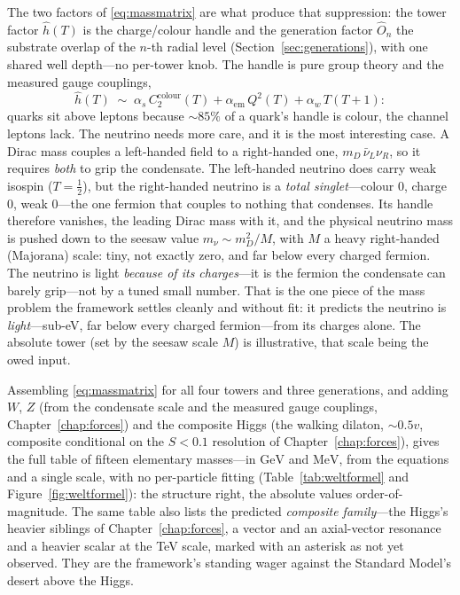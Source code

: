 The two factors of \eqref{eq:massmatrix} are what produce that suppression: the tower factor
$\hat h(T)$ is the charge/colour handle and the generation factor $\hat O_n$ the substrate overlap
of the $n$-th radial level (Section~\ref{sec:generations}), with one shared well depth---no
per-tower knob. The handle is pure group theory and the measured gauge couplings,
\begin{equation}
  \hat h(T) \;\sim\; \alpha_s\,C_2^{\mathrm{colour}}(T) + \alpha_{\mathrm{em}}\,Q^2(T)
                     + \alpha_w\,T(T{+}1):
\end{equation}
quarks sit above leptons because $\sim\!85\%$ of a quark's handle is colour, the channel leptons
lack. The neutrino needs more care, and it is the most interesting case. A Dirac mass couples a
left-handed field to a right-handed one, $m_D\,\bar\nu_L\nu_R$, so it requires \emph{both} to grip
the condensate. The left-handed neutrino does carry weak isospin ($T=\tfrac12$), but the
right-handed neutrino is a \emph{total singlet}---colour $0$, charge $0$, weak $0$---the one
fermion that couples to nothing that condenses. Its handle therefore vanishes, the leading Dirac
mass with it, and the physical neutrino mass is pushed down to the seesaw value $m_\nu\sim
m_D^2/M$, with $M$ a heavy right-handed (Majorana) scale: tiny, not exactly zero, and far below
every charged fermion. The neutrino is light \emph{because of its charges}---it is the fermion the
condensate can barely grip---not by a tuned small number. That is the one piece of the mass problem
the framework settles cleanly and without fit: it predicts the neutrino is \emph{light}---sub-eV,
far below every charged fermion---from its charges alone. The absolute tower (set by the seesaw
scale $M$) is illustrative, that scale being the owed input.

Assembling \eqref{eq:massmatrix} for all four towers and three generations, and adding $W$, $Z$
(from the condensate scale and the measured gauge couplings, Chapter~\ref{chap:forces}) and the
composite Higgs (the walking dilaton, $\sim0.5v$, composite conditional on the $S<0.1$ resolution of
Chapter~\ref{chap:forces}), gives the full table of fifteen elementary masses---in $\mathrm{GeV}$ and
$\mathrm{MeV}$, from the equations and a single scale, with no per-particle fitting
(Table~\ref{tab:weltformel} and Figure~\ref{fig:weltformel}): the structure right, the absolute
values order-of-magnitude. The same table also lists the
predicted \emph{composite family}---the Higgs's heavier siblings of Chapter~\ref{chap:forces}, a
vector and an axial-vector resonance and a heavier scalar at the TeV scale, marked with an
asterisk as not yet observed. They are the framework's standing wager against the Standard
Model's desert above the Higgs.

